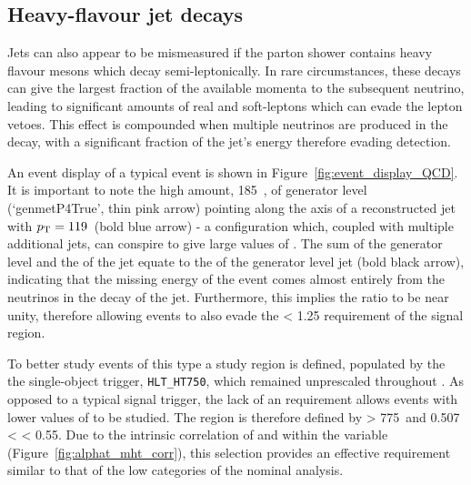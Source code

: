 \subsection{Heavy-flavour jet decays}

Jets can also appear to be mismeasured if the parton
shower contains heavy flavour mesons which decay semi-leptonically. In rare
circumstances, these decays can give the largest fraction of the available
momenta to the subsequent neutrino, leading to significant amounts of real \met
and soft-leptons which can evade the lepton vetoes.
This effect is compounded when multiple neutrinos are produced in the decay,
with a significant fraction of the jet's energy therefore evading detection.

An event display of a typical event is shown in Figure~\ref{fig:event_display_QCD}.
It is important to note the high amount, 185~\gev, of generator level
\met (`genmetP4True', thin pink arrow) pointing along the axis of a reconstructed
jet with ${p_{\text T}} = 119$~\gev (bold blue arrow) - a configuration which,
coupled with multiple additional jets, can conspire to give
large values of \alphat. The sum of the generator level \met and
the \Pt of the jet equate to the \Pt of the generator level jet (bold black
arrow),
indicating that the missing energy of the event comes almost entirely from the
neutrinos in the decay of the jet. Furthermore, this implies the ratio
\mhtmet to be near unity, therefore allowing events to also evade the \mhtmet <
1.25 requirement of the signal region.

To better study events of this type a study region is defined, populated by
the the single-object \HT trigger, \verb!HLT_HT750!, which remained unprescaled
throughout \runone. As opposed to a typical signal trigger, the lack of an
\alphat requirement allows events with lower values of \alphat to be studied.
The region is
therefore defined by \HT > 775~\gev and 0.507 < \alphat < 0.55. Due to the
intrinsic correlation of \HT and \mht within the
\alphat variable (Figure~\ref{fig:alphat_mht_corr}), this selection provides
an effective \mht requirement similar to that of the low \HT categories of the
nominal analysis.

